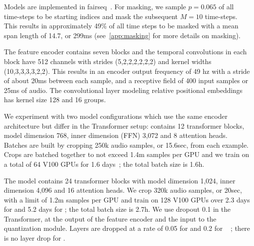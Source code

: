 \documentclass{article}
\begin{document}
Models are implemented in fairseq~\cite{ott2019fairseq}.
For masking, we sample $p=0.065$ of all time-steps to be starting indices and mask the subsequent $M=10$ time-steps.
This results in approximately 49\% of all time steps to be masked with a mean span length of 14.7, or 299ms (see~\autoref{app:masking} for more details on masking).


The feature encoder contains seven blocks and the temporal convolutions in each block have 512 channels with strides (5,2,2,2,2,2,2) and kernel widths (10,3,3,3,3,2,2).
This results in an encoder output frequency of 49 hz with a stride of about 20ms between each sample, and a receptive field of 400 input samples or 25ms of audio. 
The convolutional layer modeling relative positional embeddings has kernel size 128 and 16 groups.

We experiment with two model configurations which use the same encoder architecture but differ in the Transformer setup: \wvppbase{} contains 12 transformer blocks, model dimension 768, inner dimension (FFN) 3,072 and 8 attention heads. 
Batches are built by cropping 250k audio samples, or 15.6sec, from each example. 
Crops are batched together to not exceed 1.4m samples per GPU and we train on a total of 64 V100 GPUs for 1.6 days~\cite{ott2018scaling}; the total batch size is 1.6h.

The \wvppbig{} model contains 24 transformer blocks with model dimension 1,024, inner dimension 4,096 and 16 attention heads. 
We crop 320k audio samples, or 20sec, with a limit of 1.2m samples per GPU and train on 128 V100 GPUs over 2.3 days for \libri{} and 5.2 days for \vox{}; the total batch size is 2.7h.
We use dropout 0.1 in the Transformer, at the output of the feature encoder and the input to the quantization module. 
Layers are dropped at a rate of 0.05 for \wvppbase{} and 0.2 for \wvppbig{}~ \cite{huang2016deep,fan2019reducing}; there is no layer drop for \voxsz{}.
\end{document}
